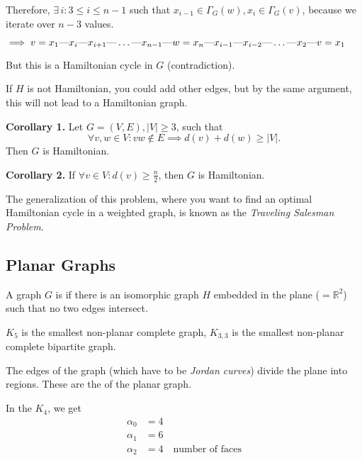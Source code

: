 Therefore, $\exists\,i: 3 ≤ i ≤ n-1$ such that
$x_{i-1}\in \Gamma_G(w), x_i\in\Gamma_G(v)$, because we iterate over $n-3$ values.

$\implies \path{v=x_1, x_i, x_{i+1}, \ldots, x_{n-1}, w=x_n, x_{i-1}, x_{i-2}, \ldots, x_2, v=x_1}$

But this is a Hamiltonian cycle in $G$ (contradiction).

If $H$ is not Hamiltonian, you could add other edges, but by the same argument, this will not lead to a Hamiltonian graph.

\textbf{Corollary 1.}
Let $G=(V,E), |V| ≥ 3$, such that
\[
    \forall v,w\in V: vw\not\in E\implies d(v) + d(w) \geq |V|.
\]
Then $G$ is Hamiltonian.

\textbf{Corollary 2.}
If 
$\forall v \in V : d(v) \geq \frac{n}{2}$,
then $G$ is Hamiltonian.

The generalization of this problem, where you want to find an optimal Hamiltonian cycle in a weighted graph, is known as the \emph{Traveling Salesman Problem}.


\subsection*{Planar Graphs}

\begin{definition}
A graph $G$ is  if there is an isomorphic graph $H$ embedded in the plane ($= \mathbb{R}^2$) such that no two edges intersect.
\end{definition}


$K_5$ is the smallest non-planar complete graph, $K_{3,3}$ is the smallest non-planar complete bipartite graph.


\begin{definition}
The edges of the graph (which have to be \emph{Jordan curves}) divide the plane into regions. These are the  of the planar graph.
\end{definition}


In the $K_4$, we get
\begin{align*}
    \alpha_0 &= 4 \\
    \alpha_1 &= 6 \\
    \alpha_2 &= 4\quad\text{number of faces}
\end{align*}


